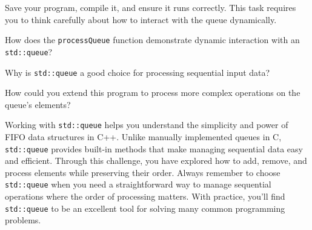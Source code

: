 \begin{challenge}
\begin{task}
        Save your program, compile it, and ensure it runs correctly. This task requires you to think carefully about how to interact with the queue dynamically.

        \begin{questions}
            \item How does the \texttt{processQueue} function demonstrate dynamic interaction with an \texttt{std::queue}?
            \item Why is \texttt{std::queue} a good choice for processing sequential input data?
            \item How could you extend this program to process more complex operations on the queue’s elements?
        \end{questions}
    \end{task}

    \begin{advise}
        Working with \texttt{std::queue} helps you understand the simplicity and power of FIFO data structures in C++. 
        Unlike manually implemented queues in C, \texttt{std::queue} provides built-in methods that make managing sequential data easy and efficient. 
        Through this challenge, you have explored how to add, remove, and process elements while preserving their order. 
        Always remember to choose \texttt{std::queue} when you need a straightforward way to manage sequential operations where the order of processing matters. 
        With practice, you'll find \texttt{std::queue} to be an excellent tool for solving many common programming problems.
    \end{advise}
\end{challenge}
